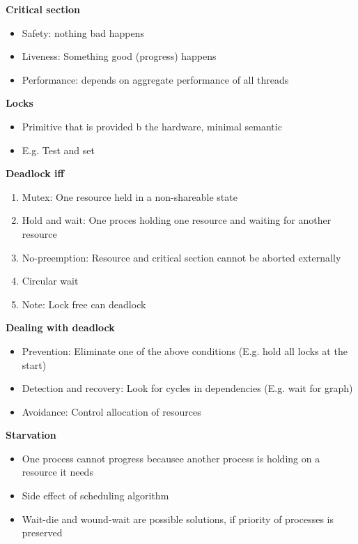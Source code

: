 \documentclass[10pt, landscape]{article}
\begin{document}
\begin{multicols}{4}
\textbf{Critical section} \\ 
\begin{itemize}
    \item Safety: nothing bad happens
    \item Liveness: Something good (progress) happens 
    \item Performance: depends on aggregate performance of all threads
\end{itemize}

\textbf{Locks} \\ 
\begin{itemize}
    \item Primitive that is provided b the hardware, minimal semantic 
    \item E.g. Test and set 
\end{itemize}

\textbf{Deadlock iff} \\ 
\begin{enumerate}
    \item Mutex: One resource held in a non-shareable state
    \item Hold and wait: One proces holding one resource and waiting for another resource 
    \item No-preemption: Resource and critical section cannot be aborted externally 
    \item Circular wait
    \item Note: Lock free can deadlock
\end{enumerate}

\textbf{Dealing with deadlock} \\
\begin{itemize}
    \item Prevention: Eliminate one of the above conditions (E.g. hold all locks at the start)
    \item Detection and recovery: Look for cycles in dependencies (E.g. wait for graph)
    \item Avoidance: Control allocation of resources
\end{itemize}

\textbf{Starvation} \\ 
\begin{itemize}
    \item One process cannot progress becausee another process is holding on a resource it needs
    \item Side effect of scheduling algorithm 
    \item Wait-die and wound-wait are possible solutions, if priority of processes is preserved
\end{itemize}


\end{multicols}
\end{document}
